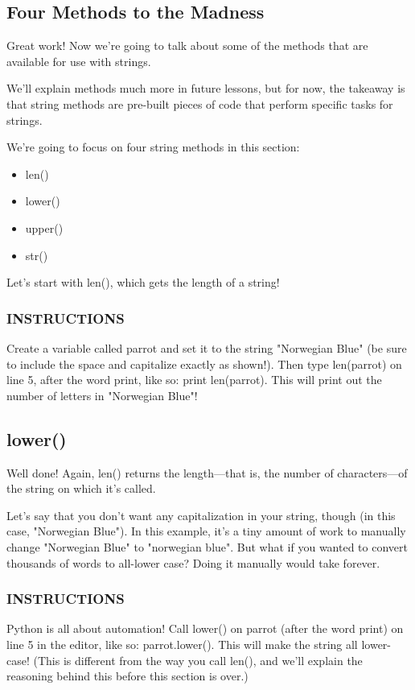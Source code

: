 \documentclass[12pt,a4paper,final,twoside,onecolumn,titlepage]{book}
\begin{document}
\subsection{Four Methods to the Madness}
Great work! Now we're going to talk about some of the methods that are available for use with strings.

We'll explain methods much more in future lessons, but for now, the takeaway is that string methods are pre-built pieces of code that perform specific tasks for strings.

We're going to focus on four string methods in this section:
\begin{itemize}
\item len()
\item lower()
\item upper()
\item str()
\end{itemize}
Let's start with len(), which gets the length of a string!

\subsubsection{INSTRUCTIONS}
Create a variable called parrot and set it to the string "Norwegian Blue" (be sure to include the space and capitalize exactly as shown!).
Then type len(parrot) on line 5, after the word print, like so: print len(parrot). This will print out the number of letters in "Norwegian Blue"!

\subsection{lower()}
Well done! Again, len() returns the length—that is, the number of characters—of the string on which it's called.

Let's say that you don't want any capitalization in your string, though (in this case, "Norwegian Blue"). In this example, it's a tiny amount of work to manually change "Norwegian Blue" to "norwegian blue". But what if you wanted to convert thousands of words to all-lower case? Doing it manually would take forever.

\subsubsection{INSTRUCTIONS}
Python is all about automation! Call lower() on parrot (after the word print) on line 5 in the editor, like so: parrot.lower(). This will make the string all lower-case! (This is different from the way you call len(), and we'll explain the reasoning behind this before this section is over.)
\end{document}

